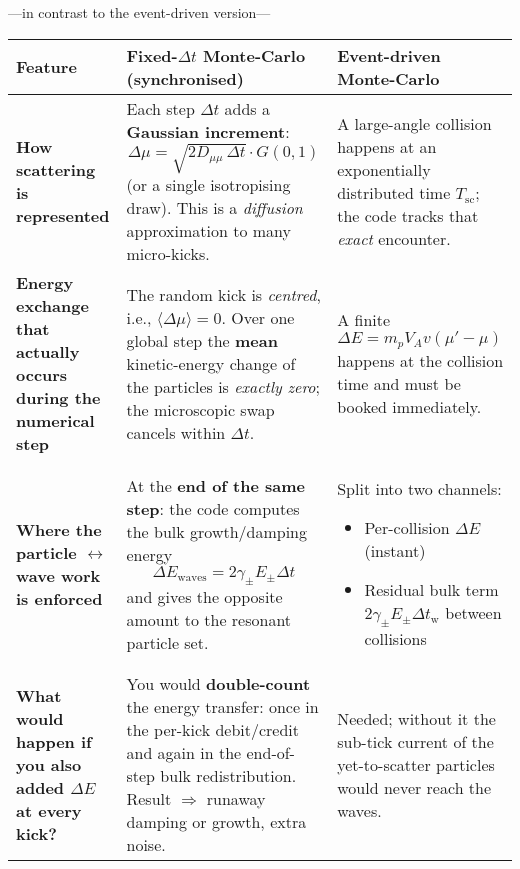 {\noindent---in contrast to the event-driven version---

\begin{table}[h!]
\centering
\renewcommand{\arraystretch}{1.4}
\begin{tabular}{|p{5.5cm}|p{6.5cm}|p{5.5cm}|}
\hline
\textbf{Feature} &
\textbf{Fixed-$\Delta t$ Monte-Carlo (synchronised)} &
\textbf{Event-driven Monte-Carlo} \\
\hline

\textbf{How scattering is represented} &
Each step $\Delta t$ adds a \textbf{Gaussian increment}:
\[
\Delta \mu = \sqrt{2 D_{\mu\mu} \, \Delta t} \cdot G(0,1)
\]
(or a single isotropising draw). This is a \emph{diffusion} approximation to many micro-kicks. &
A large-angle collision happens at an exponentially distributed time $T_{\mathrm{sc}}$; the code tracks that \emph{exact} encounter. \\
\hline

\textbf{Energy exchange that actually occurs during the numerical step} &
The random kick is \emph{centred}, i.e., $\langle \Delta \mu \rangle = 0$. \newline
Over one global step the \textbf{mean} kinetic-energy change of the particles is \emph{exactly zero}; the microscopic swap cancels within $\Delta t$. &
A finite $\Delta E = m_p V_A v (\mu' - \mu)$ happens at the collision time and must be booked immediately. \\
\hline

\textbf{Where the particle $\leftrightarrow$ wave work is enforced} &
At the \textbf{end of the same step}: the code computes the bulk growth/damping energy
\[
\Delta E_{\mathrm{waves}} = 2 \gamma_\pm E_\pm \Delta t
\]
and gives the opposite amount to the resonant particle set. &
Split into two channels:
\begin{itemize}
  \item Per-collision $\Delta E$ (instant)
  \item Residual bulk term $2\gamma_\pm E_\pm \Delta t_{\mathrm w}$ between collisions
\end{itemize} \\
\hline

\textbf{What would happen if you also added $\Delta E$ at every kick?} &
You would \textbf{double-count} the energy transfer: once in the per-kick debit/credit and again in the end-of-step bulk redistribution. Result $\Rightarrow$ runaway damping or growth, extra noise. &
Needed; without it the sub-tick current of the yet-to-scatter particles would never reach the waves. \\
\hline
\end{tabular}
\end{table}

}
